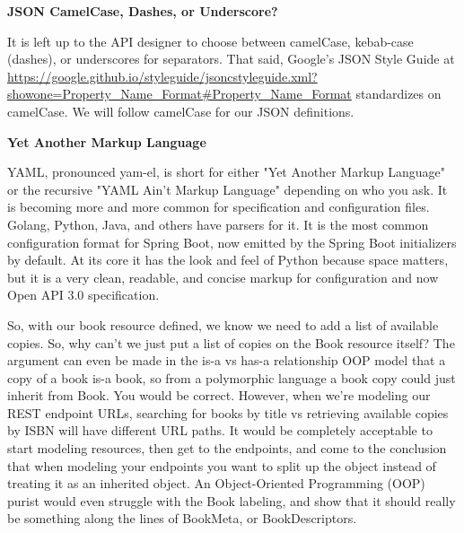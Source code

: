 \begin{sidebar}
\begin{center}
\textbf{JSON CamelCase, Dashes, or Underscore?}
\end{center}

It is left up to the API designer to choose between camelCase, kebab-case (dashes), or underscores for separators.  That said, Google's JSON Style Guide at \url{https://google.github.io/styleguide/jsoncstyleguide.xml?showone=Property_Name_Format#Property_Name_Format} standardizes on camelCase.  We will follow camelCase for our JSON definitions.

\end{sidebar}

\begin{sidebar}
\begin{center}
\textbf{Yet Another Markup Language}
\end{center}

YAML, pronounced yam-el, is short for either "Yet Another Markup Language" or the recursive "YAML Ain't Markup Language" depending on who you ask.  It is becoming more and more common for specification and configuration files.  Golang, Python, Java, and others have parsers for it.  It is the most common configuration format for Spring Boot, now emitted by the Spring Boot initializers by default.  At its core it has the look and feel of Python because space matters, but it is a very clean, readable, and concise markup for configuration and now Open API 3.0 specification.

\end{sidebar}

So, with our book resource defined, we know we need to add a list of available copies.  So, why can't we just put a list of copies on the Book resource itself?  The argument can even be made in the is-a vs has-a relationship OOP model that a copy of a book is-a book, so from a polymorphic language a book copy could just inherit from Book.  You would be correct.  However, when we're modeling our REST endpoint URLs, searching for books by title vs retrieving available copies by ISBN will have different URL paths.  It would be completely acceptable to start modeling resources, then get to the endpoints, and come to the conclusion that when modeling your endpoints you want to split up the object instead of treating it as an inherited object.  An Object-Oriented Programming (OOP) purist would even struggle with the Book labeling, and show that it should really be something along the lines of BookMeta, or BookDescriptors.

